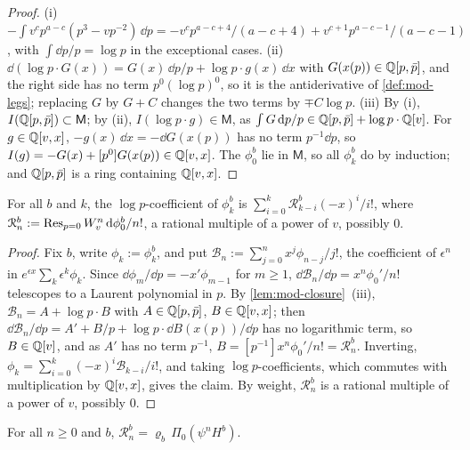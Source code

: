 \begin{proof}
(i) $-\int v^cp^{a-c}(p^3-vp^{-2})\,\dd p=-v^cp^{a-c+4}/(a-c+4)+v^{c+1}p^{a-c-1}/(a-c-1)$, with $\int\dd p/p=\log p$ in the exceptional cases. (ii) $\dd(\log p\cdot G(x))=G(x)\,\dd p/p+\log p\cdot g(x)\,\dd x$ with $G(x(p))\in\mathbb{Q}[p,\bar p]$, and the right side has no term $p^0(\log p)^0$, so it is the antiderivative of \cref{def:mod-legs}; replacing $G$ by $G+C$ changes the two terms by $\mp C\log p$. (iii) By (i), $I(\mathbb{Q}[p,\bar p])\subset\mathsf M$; by (ii), $I(\log p\cdot g)\in\mathsf M$, as $\int G\,\mathrm{d} p/p\in\mathbb{Q}[p,\bar p]+\log p\cdot\mathbb{Q}[v]$. For $g\in\mathbb{Q}[v,x]$, $-g(x)\,\dd x=-\dd G(x(p))$ has no term $p^{-1}\dd p$, so $I(g)=-G(x)+[p^0]G(x(p))\in\mathbb{Q}[v,x]$. The $\phi^b_0$ lie in $\mathsf M$, so all $\phi^b_k$ do by induction; and $\mathbb{Q}[p,\bar p]$ is a ring containing $\mathbb{Q}[v,x]$.
\end{proof}

\begin{lem}
\label{lem:mod-genfn}
For all $b$ and $k$, the $\log p$-coefficient of $\phi^b_k$ is $\sum_{i=0}^k\mathcal R^b_{k-i}(-x)^i/i!$, where $\mathcal R^b_n:=\operatorname*{Res}_{p=0}W_{v}^n\,\mathrm{d}\phi^b_0/n!$, a rational multiple of a power of $v$, possibly $0$.
\end{lem}

\begin{proof}
Fix $b$, write $\phi_k:=\phi^b_k$, and put $\mathcal B_n:=\sum_{j=0}^nx^j\phi_{n-j}/j!$, the coefficient of $\epsilon^n$ in $e^{\epsilon x}\sum_k\epsilon^k\phi_k$. Since $\dd\phi_m/\dd p=-x'\phi_{m-1}$ for $m\geq 1$, $\dd\mathcal B_n/\dd p=x^n\phi_0'/n!$ telescopes to a Laurent polynomial in $p$. By \cref{lem:mod-closure}~(iii), $\mathcal B_n=A+\log p\cdot B$ with $A\in\mathbb{Q}[p,\bar p]$, $B\in\mathbb{Q}[v,x]$; then $\dd\mathcal B_n/\dd p=A'+B/p+\log p\cdot\dd B(x(p))/\dd p$ has no logarithmic term, so $B\in\mathbb{Q}[v]$, and as $A'$ has no term $p^{-1}$, $B=[p^{-1}]x^n\phi_0'/n!=\mathcal R^b_n$. Inverting, $\phi_k=\sum_{i=0}^k(-x)^i\mathcal B_{k-i}/i!$, and taking $\log p$-coefficients, which commutes with multiplication by $\mathbb{Q}[v,x]$, gives the claim. By weight, $\mathcal R^b_n$ is a rational multiple of a power of $v$, possibly $0$.
\end{proof}

\begin{lem}
\label{lem:mod-resid}
For all $n\geq 0$ and $b$, $\mathcal R^b_n=\varrho_b\,\Pi_0(\psi^nH^b)$.
\end{lem}

